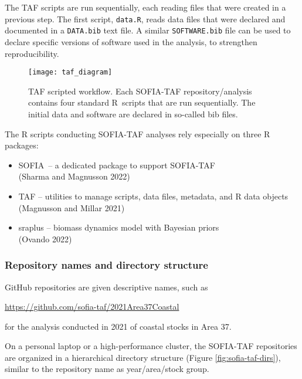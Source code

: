 \documentclass[12pt]{article}
\newcommand\blue[1]{\textcolor{darkblue}{#1}}
\newcommand\SOFIA{{\sf SOFIA}}
\begin{document}
The TAF scripts are run sequentially, each reading files that were created in a
previous step. The first script, \verb|data.R|, reads data files that were
declared and documented in a \verb|DATA.bib| text file. A similar
\verb|SOFTWARE.bib| file can be used to declare specific versions of software
used in the analysis, to strengthen reproducibility.

\begin{figure}[htb]
  \begin{center}
    \texttt{[image: taf\_diagram]}
    \vspace{2ex}
    \caption{TAF scripted workflow. Each SOFIA-TAF repository/analysis contains
      four standard R~scripts that are run sequentially. The initial data and
      software are declared in so-called bib files.}
    \label{fig:taf-diagram}
  \end{center}
\end{figure}

\newpage

The R scripts conducting SOFIA-TAF analyses rely especially on three R
packages:\\[-2ex]

\begin{itemize}
  \item \SOFIA\ -- a dedicated package to support SOFIA-TAF\\
  (Sharma and Magnusson 2022)
  \item {\sf TAF} -- utilities to manage scripts, data files, metadata, and R
  data objects\\
  (Magnusson and Millar 2021)
  \item {\sf sraplus} -- biomass dynamics model with Bayesian priors\\
  (Ovando 2022)
\end{itemize}

\subsubsection{Repository names and directory structure}

GitHub repositories are given descriptive names, such as

\qquad\blue{\url{https://github.com/sofia-taf/2021Area37Coastal}}

for the analysis conducted in 2021 of coastal stocks in Area 37.

On a personal laptop or a high-performance cluster, the SOFIA-TAF repositories
are organized in a hierarchical directory structure (Figure
\ref{fig:sofia-taf-dirs}), similar to the repository name as year/area/stock
group.\\
\end{document}
